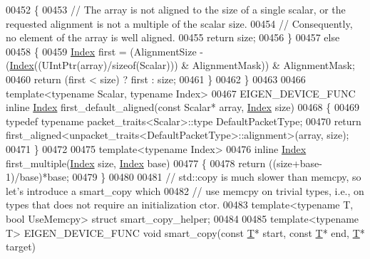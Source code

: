 \begin{DoxyCode}
00452   \{
00453     \textcolor{comment}{// The array is not aligned to the size of a single scalar, or the requested alignment is not a
       multiple of the scalar size.}
00454     \textcolor{comment}{// Consequently, no element of the array is well aligned.}
00455     \textcolor{keywordflow}{return} size;
00456   \}
00457   \textcolor{keywordflow}{else}
00458   \{
00459     \hyperlink{namespace_eigen_a62e77e0933482dafde8fe197d9a2cfde}{Index} first = (AlignmentSize - (\hyperlink{namespace_eigen_a62e77e0933482dafde8fe197d9a2cfde}{Index}((UIntPtr(array)/\textcolor{keyword}{sizeof}(Scalar))) & AlignmentMask)) & 
      AlignmentMask;
00460     \textcolor{keywordflow}{return} (first < size) ? first : size;
00461   \}
00462 \}
00463 
00466 \textcolor{keyword}{template}<\textcolor{keyword}{typename} Scalar, \textcolor{keyword}{typename} Index>
00467 EIGEN\_DEVICE\_FUNC \textcolor{keyword}{inline} \hyperlink{namespace_eigen_a62e77e0933482dafde8fe197d9a2cfde}{Index} first\_default\_aligned(\textcolor{keyword}{const} Scalar* array, 
      \hyperlink{namespace_eigen_a62e77e0933482dafde8fe197d9a2cfde}{Index} size)
00468 \{
00469   \textcolor{keyword}{typedef} \textcolor{keyword}{typename} packet\_traits<Scalar>::type DefaultPacketType;
00470   \textcolor{keywordflow}{return} first\_aligned<unpacket\_traits<DefaultPacketType>::alignment>(array, size);
00471 \}
00472 
00475 \textcolor{keyword}{template}<\textcolor{keyword}{typename} Index> 
00476 \textcolor{keyword}{inline} \hyperlink{namespace_eigen_a62e77e0933482dafde8fe197d9a2cfde}{Index} first\_multiple(\hyperlink{namespace_eigen_a62e77e0933482dafde8fe197d9a2cfde}{Index} size, \hyperlink{namespace_eigen_a62e77e0933482dafde8fe197d9a2cfde}{Index} base)
00477 \{
00478   \textcolor{keywordflow}{return} ((size+base-1)/base)*base;
00479 \}
00480 
00481 \textcolor{comment}{// std::copy is much slower than memcpy, so let's introduce a smart\_copy which}
00482 \textcolor{comment}{// use memcpy on trivial types, i.e., on types that does not require an initialization ctor.}
00483 \textcolor{keyword}{template}<\textcolor{keyword}{typename} T, \textcolor{keywordtype}{bool} UseMemcpy> \textcolor{keyword}{struct }smart\_copy\_helper;
00484 
00485 \textcolor{keyword}{template}<\textcolor{keyword}{typename} T> EIGEN\_DEVICE\_FUNC \textcolor{keywordtype}{void} smart\_copy(\textcolor{keyword}{const} \hyperlink{group___sparse_core___module_class_eigen_1_1_triplet}{T}* start, \textcolor{keyword}{const} \hyperlink{group___sparse_core___module_class_eigen_1_1_triplet}{T}* end, 
      \hyperlink{group___sparse_core___module_class_eigen_1_1_triplet}{T}* target)

\end{DoxyCode}
